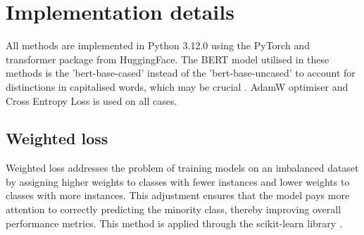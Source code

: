 \section{Implementation details}

All methods are implemented in Python 3.12.0 \cite{van-1995-python} using the PyTorch \cite{paszke-2017-pytorch} and transformer \cite{wolf-2020-huggingface} package from HuggingFace. The BERT model utilised in these methods is the 'bert-base-cased' instead of the 'bert-base-uncased' to account for distinctions in capitalised words, which may be crucial \cite{devlin-2019-bert}. AdamW \cite{loshchilov-2019-adamw} optimiser and Cross Entropy Loss is used on all cases.

\subsection{Weighted loss}

Weighted loss addresses the problem of training models on an imbalanced dataset by assigning higher weights to classes with fewer instances and lower weights to classes with more instances. This adjustment ensures that the model pays more attention to correctly predicting the minority class, thereby improving overall performance metrics. This method is applied through the scikit-learn library \cite{pedregosa-2011-scikit-learn}.

